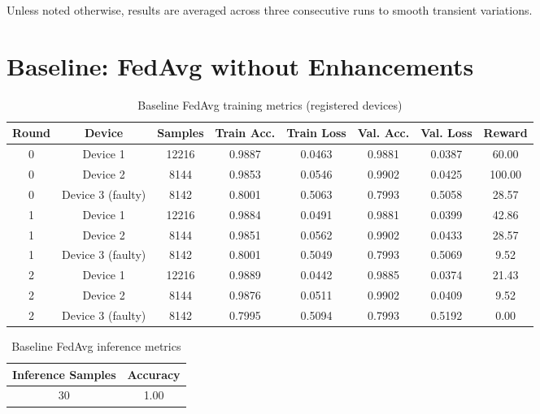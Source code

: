 Unless noted otherwise, results are averaged across three consecutive runs to smooth transient variations.

\section{Baseline: FedAvg without Enhancements}

\begin{table}[h!]
    \centering
    \caption{Baseline FedAvg training metrics (registered devices)}
    \label{tab:baseline_fedavg}
    \begin{tabular}{c c c c c c c c}
        \toprule
        \textbf{Round} & \textbf{Device} & \textbf{Samples} & \textbf{Train Acc.} & \textbf{Train Loss} & \textbf{Val. Acc.} & \textbf{Val. Loss} & \textbf{Reward} \\
        \midrule
        0 & Device 1 & 12216 & 0.9887 & 0.0463 & 0.9881 & 0.0387 & 60.00 \\
        0 & Device 2 & 8144 & 0.9853 & 0.0546 & 0.9902 & 0.0425 & 100.00 \\
        0 & Device 3 (faulty) & 8142 & 0.8001 & 0.5063 & 0.7993 & 0.5058 & 28.57 \\
        1 & Device 1 & 12216 & 0.9884 & 0.0491 & 0.9881 & 0.0399 & 42.86 \\
        1 & Device 2 & 8144 & 0.9851 & 0.0562 & 0.9902 & 0.0433 & 28.57 \\
        1 & Device 3 (faulty) & 8142 & 0.8001 & 0.5049 & 0.7993 & 0.5069 & 9.52 \\
        2 & Device 1 & 12216 & 0.9889 & 0.0442 & 0.9885 & 0.0374 & 21.43 \\
        2 & Device 2 & 8144 & 0.9876 & 0.0511 & 0.9902 & 0.0409 & 9.52 \\
        2 & Device 3 (faulty) & 8142 & 0.7995 & 0.5094 & 0.7993 & 0.5192 & 0.00 \\
        \bottomrule
    \end{tabular}
\end{table}

\begin{table}[h!]
    \centering
    \caption{Baseline FedAvg inference metrics}
    \label{tab:baseline_inference}
    \begin{tabular}{c c}
        \toprule
        \textbf{Inference Samples} & \textbf{Accuracy} \\
        \midrule
        30 & 1.00 \\
        \bottomrule
    \end{tabular}
\end{table}

